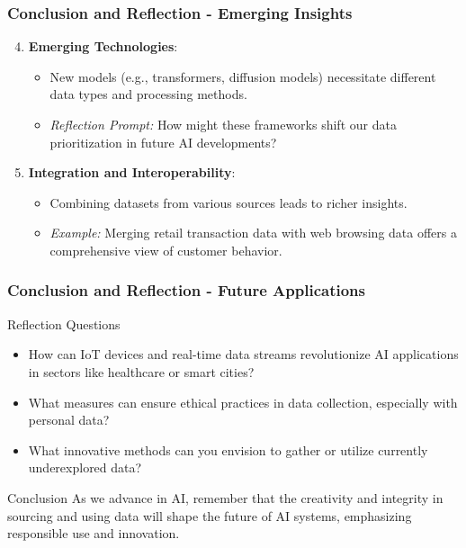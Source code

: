 \documentclass[aspectratio=169]{beamer}
\begin{document}
\begin{frame}[fragile]
    \frametitle{Conclusion and Reflection - Emerging Insights}
    \begin{enumerate}
        \setcounter{enumi}{3}
        \item \textbf{Emerging Technologies}:
        \begin{itemize}
            \item New models (e.g., transformers, diffusion models) necessitate different data types and processing methods.
            \item \textit{Reflection Prompt:} How might these frameworks shift our data prioritization in future AI developments?
        \end{itemize}

        \item \textbf{Integration and Interoperability}:
        \begin{itemize}
            \item Combining datasets from various sources leads to richer insights.
            \item \textit{Example:} Merging retail transaction data with web browsing data offers a comprehensive view of customer behavior.
        \end{itemize}
    \end{enumerate}
\end{frame}

\begin{frame}[fragile]
    \frametitle{Conclusion and Reflection - Future Applications}
    \begin{block}{Reflection Questions}
        \begin{itemize}
            \item How can IoT devices and real-time data streams revolutionize AI applications in sectors like healthcare or smart cities?
            \item What measures can ensure ethical practices in data collection, especially with personal data?
            \item What innovative methods can you envision to gather or utilize currently underexplored data?
        \end{itemize}
    \end{block}

    \begin{block}{Conclusion}
        As we advance in AI, remember that the creativity and integrity in sourcing and using data will shape the future of AI systems, emphasizing responsible use and innovation.
    \end{block}
\end{frame}
\end{document}

